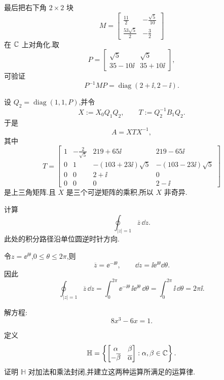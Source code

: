 \begin{problem}
\begin{solution}
最后把右下角 $2\times2$ 块
\[
M=\begin{bmatrix}
\frac{11}{2} & -\frac{\sqrt5}{10}\\
\frac{53\sqrt5}{2} & -\frac{3}{2}
\end{bmatrix}
\]
在 $\mathbb{C}$ 上对角化.取
\[
P=
\begin{bmatrix}
\sqrt5 & \sqrt5\\
35-10\ii & 35+10\ii
\end{bmatrix},
\]
可验证
\[
P^{-1}MP=\operatorname{diag}(2+\ii,2-\ii).
\]

设 $Q_2=\operatorname{diag}(1,1,P)$,并令
\[
X:=X_0Q_1Q_2,\qquad T:=Q_2^{-1}B_1Q_2.
\]
于是
\[
A=XTX^{-1},
\]
其中
\[
T=
\begin{bmatrix}
1 & -\frac2{\sqrt5} & 219+65\ii & 219-65\ii\\
0 & 1 & -(103+23\ii)\sqrt5 & -(103-23\ii)\sqrt5\\
0 & 0 & 2+\ii & 0\\
0 & 0 & 0 & 2-\ii
\end{bmatrix}
\]
是上三角矩阵.且 $X$ 是三个可逆矩阵的乘积,所以 $X$ 非奇异.
\end{solution}
\end{problem}

\begin{problem}
计算
\[
\oint_{|z|=1} \overline{z}\,\dd z.
\]
此处的积分路径沿单位圆逆时针方向.

\begin{solution}
令$z=\ee^{\ii\theta}$,$0\le\theta\le2\pi$,则
\[
\overline z=\ee^{-\ii\theta},\qquad
\dd z=\ii\ee^{\ii\theta}\dd\theta.
\]
因此
\[
\oint_{|z|=1}\overline z\,\dd z
=\int_0^{2\pi}\ee^{-\ii\theta}\,\ii\ee^{\ii\theta}\,\dd\theta
=\int_0^{2\pi}\ii\,\dd\theta
=2\pi\ii.
\]
\end{solution}
\end{problem}

\begin{problem}[选做]
解方程:
\[
8x^3 - 6x = 1.
\]

\begin{solution}
\end{solution}
\end{problem}

\begin{problem}[选做]
定义
\[
\mathbb{H} = \left\{
\begin{bmatrix}
\alpha & \beta \\
-\overline{\beta} & \overline{\alpha}
\end{bmatrix}
: \alpha,\beta\in\mathbb{C}
\right\}.
\]
证明 $\mathbb{H}$ 对加法和乘法封闭,并建立这两种运算所满足的运算律.

\begin{solution}
\end{solution}
\end{problem}

